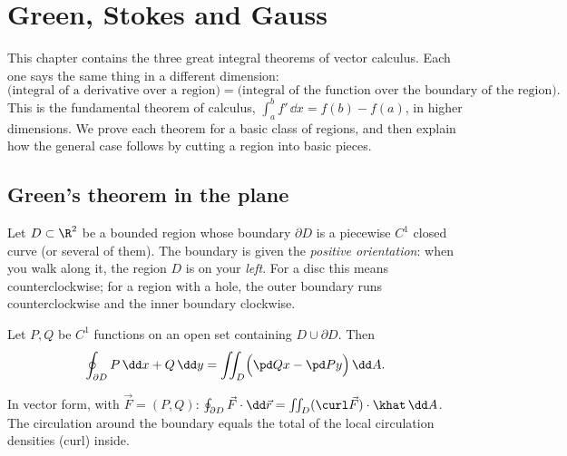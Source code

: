 \chapter{Green, Stokes and Gauss}
\label{ch:theorems}

This chapter contains the three great integral theorems of vector calculus. Each one says the same thing in a different dimension:
\[
\text{(integral of a derivative over a region)}=\text{(integral of the function over the boundary of the region)} .
\]
This is the fundamental theorem of calculus, $\int_a^bf'\,\dd x=f(b)-f(a)$, in higher dimensions. We prove each theorem for a basic class of regions, and then explain how the general case follows by cutting a region into basic pieces.

\section{Green's theorem in the plane}

Let $D\subset\R^2$ be a bounded region whose boundary $\partial D$ is a piecewise $C^1$ closed curve (or several of them). The boundary is given the \emph{positive orientation}: when you walk along it, the region $D$ is on your \emph{left}. For a disc this means counterclockwise; for a region with a hole, the outer boundary runs counterclockwise and the inner boundary clockwise.

\begin{theorem}\label{thm:green}
Let $P,Q$ be $C^1$ functions on an open set containing $D\cup\partial D$. Then
\[
\oint_{\partial D}P\,\dd x+Q\,\dd y=\iint_D\Bigl(\pd Qx-\pd Py\Bigr)\,\dd A .
\]
\end{theorem}

In vector form, with $\vec F=(P,Q)$: $\oint_{\partial D}\vec F\cdot\dd\vec r=\iint_D(\curl\vec F)\cdot\khat\,\dd A$. The circulation around the boundary equals the total of the local circulation densities (curl) inside.

